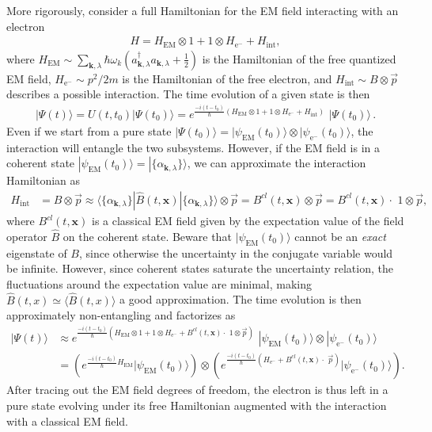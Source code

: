 \documentclass[../QFT_main.tex]{subfiles}
\begin{document}
\begin{mytheorem}
More rigorously, consider a full Hamiltonian for the {\small EM} field interacting with an electron
\begin{align}
    H = H_{\mathrm{EM}}\otimes 1 + 1 \otimes H_{\mathrm{e}^-} + H_{\mathrm{int}},
\end{align}
where $H_{\mathrm{EM}} \sim \sum_{\mathbf{k},\lambda} \hbar \omega_k (a_{\mathbf{k},\lambda}^\dagger a_{\mathbf{k},\lambda} + \tfrac{1}{2})$ is the Hamiltonian of the free quantized {\small EM} field, $H_{\mathrm{e}^-}\sim p^2/2m$ is the Hamiltonian of the free electron, and $H_{\mathrm{int}}\sim B \otimes \vec{p}$ describes a possible interaction.
The time evolution of a given state is then
\begin{align}
    |\Psi(t)\rangle = U(t,t_0) |\Psi(t_0)\rangle = e^{\tfrac{-i(t-t_0)}{\hbar} \left(H_{\mathrm{EM}}\otimes 1 + 1 \otimes H_{\mathrm{e}^-} + H_{\mathrm{int}}\right)}\,\,
    |\Psi(t_0)\rangle\,.
\end{align}
Even if we start from a pure state $|\Psi(t_0)\rangle = |\psi_{\mathrm{EM}}(t_0)\rangle \otimes |\psi_{\mathrm{e}^-}(t_0)\rangle$, the interaction will entangle the two subsystems.
However, if the {\small EM} field is in a coherent state $|\psi_{\mathrm{EM}}(t_0)\rangle = |\{\alpha_{\mathbf{k},\lambda}\}\rangle$, we can approximate the interaction Hamiltonian as
\begin{align}
    H_{\mathrm{int}} &= B \otimes \vec{p} \approx \langle \{\alpha_{\mathbf{k},\lambda}\}| \hat{B}(t,\mathbf{x}) | \{\alpha_{\mathbf{k},\lambda}\}\rangle \otimes \vec{p} = B^{cl}(t,\mathbf{x}) \otimes \vec{p} = B^{cl}(t,\mathbf{x})\cdot\,\, 1 \otimes \vec{p},
\end{align}
where $B^{cl}(t,\mathbf{x})$ is a classical {\small EM} field given by the expectation value of the field operator $\hat{B}$ on the coherent state.
Beware that $|\psi_{\mathrm{EM}}(t_0)\rangle$ cannot be an \emph{exact} eigenstate of $B$, since otherwise the uncertainty in the conjugate variable would be infinite.
However, since coherent states saturate the uncertainty relation, the fluctuations around the expectation value are minimal, making $\hat{B}(t,x)\simeq \langle \hat{B}(t,x) \rangle$ a good approximation.
The time evolution is then approximately non-entangling and factorizes as
\begin{align}
    |\Psi(t)\rangle &\approx e^{\tfrac{-i(t-t_0)}{\hbar} \left(H_{\mathrm{EM}}\otimes 1 + 1 \otimes H_{\mathrm{e}^-} + B^{cl}(t,\mathbf{x})\cdot\,\, 1 \otimes \vec{p}\right)}\,\,
    |\psi_{\mathrm{EM}}(t_0)\rangle \otimes |\psi_{\mathrm{e}^-}(t_0)\rangle
    \\
    &= \left(e^{\tfrac{-i(t-t_0)}{\hbar} H_{\mathrm{EM}}} |\psi_{\mathrm{EM}}(t_0)\rangle\right) \otimes \left(e^{\tfrac{-i(t-t_0)}{\hbar} \left(H_{\mathrm{e}^-} + B^{cl}(t,\mathbf{x})\cdot\,\, \vec{p}\right)} |\psi_{\mathrm{e}^-}(t_0)\rangle\right).
\end{align}
After tracing out the {\small EM} field degrees of freedom, the electron is thus left in a pure state evolving under its free Hamiltonian augmented with the interaction with a classical EM field.
%
\end{mytheorem}
\end{document}
